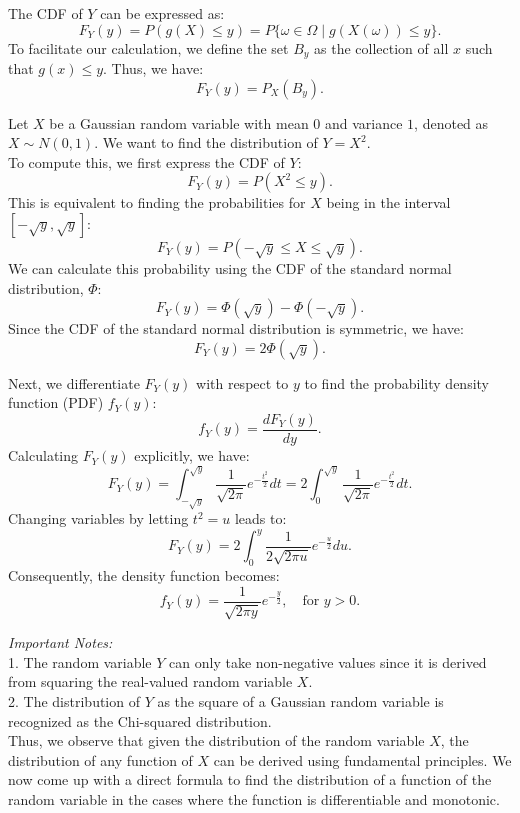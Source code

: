 The CDF of \( Y \) can be expressed as:
\[
F_Y(y) = P(g(X) \leq y) = P\{ \omega \in \Omega \mid g(X(\omega)) \leq y \}.
\]
To facilitate our calculation, we define the set \( B_y \) as the collection of all \( x \) such that \( g(x) \leq y \). Thus, we have:
\[
F_Y(y) = P_X(B_y).
\]

\begin{example}
    Let \( X \) be a Gaussian random variable with mean \( 0 \) and variance \( 1 \), denoted as \( X \sim N(0, 1) \). We want to find the distribution of \( Y = X^2 \).\\

    To compute this, we first express the CDF of \( Y \):
    \[
    F_Y(y) = P(X^2 \leq y).
    \]
    This is equivalent to finding the probabilities for \( X \) being in the interval \( [-\sqrt{y}, \sqrt{y}] \):
    \[
    F_Y(y) = P(-\sqrt{y} \leq X \leq \sqrt{y}).
    \]
    We can calculate this probability using the CDF of the standard normal distribution, \( \Phi \):
    \[
    F_Y(y) = \Phi(\sqrt{y}) - \Phi(-\sqrt{y}).
    \]
    Since the CDF of the standard normal distribution is symmetric, we have:
    \[
    F_Y(y) = 2 \Phi(\sqrt{y}).
    \]
    
    Next, we differentiate \( F_Y(y) \) with respect to \( y \) to find the probability density function (PDF) \( f_Y(y) \):
    \[
    f_Y(y) = \frac{dF_Y(y)}{dy}.
    \]
    Calculating \( F_Y(y) \) explicitly, we have:
    \[
    F_Y(y) = \int_{-\sqrt{y}}^{\sqrt{y}} \frac{1}{\sqrt{2\pi}} e^{-\frac{t^2}{2}} dt = 2 \int_{0}^{\sqrt{y}} \frac{1}{\sqrt{2\pi}} e^{-\frac{t^2}{2}} dt.
    \]
    Changing variables by letting \( t^2 = u \) leads to:
    \[
    F_Y(y) = 2 \int_{0}^{y} \frac{1}{2\sqrt{2\pi u}} e^{-\frac{u}{2}} du.
    \]
    Consequently, the density function becomes:
    \[
    f_Y(y) = \frac{1}{\sqrt{2\pi y}} e^{-\frac{y}{2}}, \quad \text{for } y > 0.
    \]    
\end{example}

\textit{Important Notes:}\\

1. The random variable \( Y \) can only take non-negative values since it is derived from squaring the real-valued random variable \( X \).\\
2. The distribution of \( Y \) as the square of a Gaussian random variable is recognized as the Chi-squared distribution.\\

Thus, we observe that given the distribution of the random variable \( X \), the distribution of any function of \( X \) can be derived using fundamental principles. We now come up with a direct formula to find the distribution of a function of the random variable in the cases where the function is differentiable and monotonic.\\

